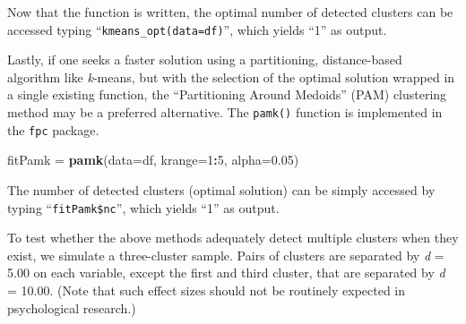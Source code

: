 \documentclass[
  man,floatsintext]{apa7}
\newenvironment{Shaded}{\begin{snugshade}}{\end{snugshade}}
\newcommand{\AttributeTok}[1]{\textcolor[rgb]{0.13,0.29,0.53}{#1}}
\newcommand{\DecValTok}[1]{\textcolor[rgb]{0.00,0.00,0.81}{#1}}
\newcommand{\FloatTok}[1]{\textcolor[rgb]{0.00,0.00,0.81}{#1}}
\newcommand{\FunctionTok}[1]{\textcolor[rgb]{0.13,0.29,0.53}{\textbf{#1}}}
\newcommand{\NormalTok}[1]{#1}
\newcommand{\OtherTok}[1]{\textcolor[rgb]{0.56,0.35,0.01}{#1}}
\newcommand{\SpecialCharTok}[1]{\textcolor[rgb]{0.81,0.36,0.00}{\textbf{#1}}}
\begin{document}
Now that the function is written, the optimal number of detected clusters can be accessed typing ``\texttt{kmeans\_opt(data=df)}'', which yields ``1'' as output.

Lastly, if one seeks a faster solution using a partitioning, distance-based algorithm like \emph{k}-means, but with the selection of the optimal solution wrapped in a single existing function, the ``Partitioning Around Medoids'' (PAM) clustering method may be a preferred alternative. The \texttt{pamk()} function is implemented in the \texttt{fpc} package.

\begin{Shaded}
\begin{Highlighting}[]
\NormalTok{fitPamk }\OtherTok{=} \FunctionTok{pamk}\NormalTok{(}\AttributeTok{data=}\NormalTok{df, }\AttributeTok{krange=}\DecValTok{1}\SpecialCharTok{:}\DecValTok{5}\NormalTok{, }\AttributeTok{alpha=}\FloatTok{0.05}\NormalTok{)}
\end{Highlighting}
\end{Shaded}

The number of detected clusters (optimal solution) can be simply accessed by typing ``\texttt{fitPamk\$nc}'', which yields ``1'' as output.

To test whether the above methods adequately detect multiple clusters when they exist, we simulate a three-cluster sample. Pairs of clusters are separated by \emph{d} = 5.00 on each variable, except the first and third cluster, that are separated by \emph{d} = 10.00. (Note that such effect sizes should not be routinely expected in psychological research.)
\end{document}
